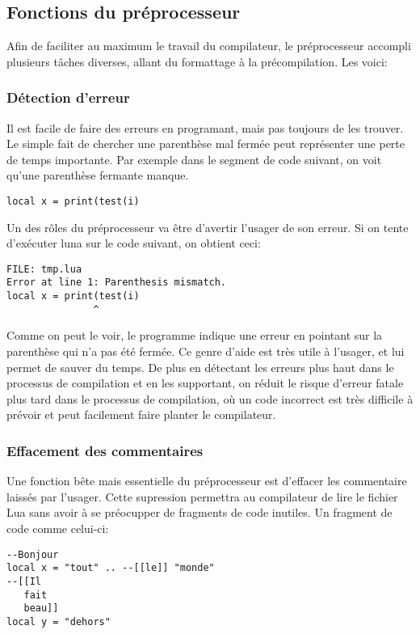 \documentclass{article}
\begin{document}
\subsection{Fonctions du préprocesseur}
Afin de faciliter au maximum le travail du compilateur, le préprocesseur accompli plusieurs tâches diverses, allant du formattage à la précompilation. Les voici:

\subsubsection{Détection d'erreur}
Il est facile de faire des erreurs en programant, mais pas toujours de les trouver. Le simple fait de chercher une parenthèse mal fermée peut représenter une perte de temps importante. Par exemple dans le segment de code suivant, on voit qu'une parenthèse fermante manque.
\lstset{style = lua}
\begin{lstlisting}[caption={Mauvais parenthèsage},label=DescriptiveLabel]
  local x = print(test(i)
\end{lstlisting}

Un des rôles du préprocesseur va être d'avertir l'usager de son erreur. Si on tente d'exécuter luna sur le code suivant, on obtient ceci:
\lstset{style = out}
\begin{lstlisting}
FILE: tmp.lua
Error at line 1: Parenthesis mismatch.
local x = print(test(i)
               ^
\end{lstlisting}
Comme on peut le voir, le programme indique une erreur en pointant sur la parenthèse qui n'a pas été fermée. Ce genre d'aide est très utile à l'usager, et lui permet de sauver du temps. De plus en détectant les erreurs plus haut dans le processus de compilation et en les supportant, on réduit le risque d'erreur fatale plus tard dans le processus de compilation, où un code incorrect est très difficile à prévoir et peut facilement faire planter le compilateur.

\subsubsection{Effacement des commentaires}
Une fonction bête mais essentielle du préprocesseur est d'effacer les commentaire laissés par l'usager. Cette supression permettra au compilateur de lire le fichier Lua sans avoir à se préocupper de fragments de code inutiles. Un fragment de code comme celui-ci:
\lstset{style = lua}
\begin{lstlisting}[caption={Commentaires multiples},label=DescriptiveLabel]
--Bonjour
local x = "tout" .. --[[le]] "monde"
--[[Il
   fait
   beau]]
local y = "dehors"
\end{lstlisting}
\end{document}
